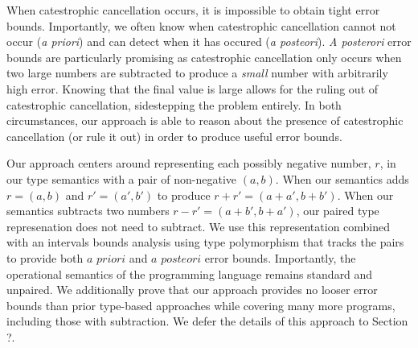 When catestrophic cancellation occurs, it is impossible to obtain tight error
bounds. Importantly, we often know when catestrophic cancellation cannot not
occur (\textit{a priori}) and can detect when it has occured (\textit{a
posteori}). \textit{A posterori} error bounds are particularly promising as
catestrophic cancellation only occurs when two large numbers are subtracted to
produce a \textit{small} number with arbitrarily high error. Knowing that the
final value is large allows for the ruling out of catestrophic cancellation,
sidestepping the problem entirely.
In both circumstances, our approach is able to reason about the presence of
catestrophic cancellation (or rule it out) in order to produce useful error
bounds.

Our approach centers around representing each possibly negative number, $r$, in
our type semantics with a pair of non-negative $(a, b)$. When our semantics adds
$r = (a, b)$ and $r' = (a', b')$ to produce $r + r' = (a + a', b + b')$. When
our semantics subtracts two numbers $r - r' = (a + b', b + a')$, our paired type
represenation does not need to subtract. We use this representation combined
with an intervals bounds analysis using type polymorphism that tracks the pairs
to provide both $\textit{a priori}$ and $\textit{a posteori}$ error bounds.
Importantly, the operational semantics of the programming language remains
standard and unpaired. We additionally prove that our approach provides no
looser error bounds than prior type-based approaches while covering many more
programs, including those with subtraction. We defer the details of this
approach to Section ?. %

